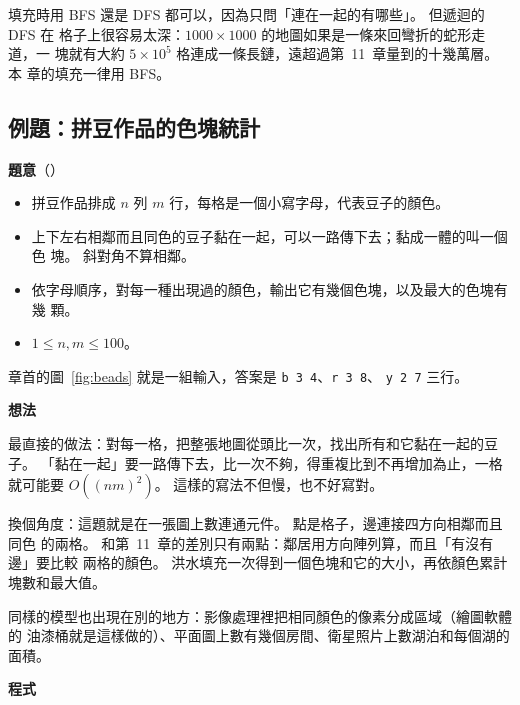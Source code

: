 填充時用 BFS 還是 DFS 都可以，因為只問「連在一起的有哪些」。 但遞迴的 DFS 在
格子上很容易太深：$1000 \times 1000$ 的地圖如果是一條來回彎折的蛇形走道，一
塊就有大約 $5 \times 10^5$ 格連成一條長鏈，遠超過第~11~章量到的十幾萬層。 本
章的填充一律用 BFS。

\subsection{例題：拼豆作品的色塊統計}
\label{sec:ex-beads}

\textbf{題意}（）

\begin{itemize}
\item 拼豆作品排成 $n$ 列 $m$ 行，每格是一個小寫字母，代表豆子的顏色。
\item 上下左右相鄰而且同色的豆子黏在一起，可以一路傳下去；黏成一體的叫一個色
塊。 斜對角不算相鄰。
\item 依字母順序，對每一種出現過的顏色，輸出它有幾個色塊，以及最大的色塊有幾
顆。
\item $1 \le n, m \le 100$。
\end{itemize}

章首的圖~\ref{fig:beads} 就是一組輸入，答案是 \texttt{b 3 4}、\texttt{r 3 8}、
\texttt{y 2 7} 三行。

\textbf{想法}

最直接的做法：對每一格，把整張地圖從頭比一次，找出所有和它黏在一起的豆子。
「黏在一起」要一路傳下去，比一次不夠，得重複比到不再增加為止，一格就可能要
$O((nm)^2)$。 這樣的寫法不但慢，也不好寫對。

換個角度：這題就是在一張圖上數連通元件。 點是格子，邊連接四方向相鄰而且同色
的兩格。 和第~11~章的差別只有兩點：鄰居用方向陣列算，而且「有沒有邊」要比較
兩格的顏色。 洪水填充一次得到一個色塊和它的大小，再依顏色累計塊數和最大值。

同樣的模型也出現在別的地方：影像處理裡把相同顏色的像素分成區域（繪圖軟體的
油漆桶就是這樣做的）、平面圖上數有幾個房間、衛星照片上數湖泊和每個湖的面積。

\textbf{程式}

